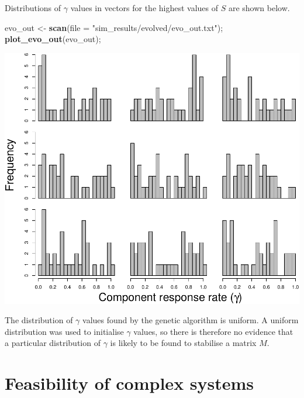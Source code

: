 \documentclass[]{article}
\newenvironment{Shaded}{\begin{snugshade}}{\end{snugshade}}
\newcommand{\KeywordTok}[1]{\textcolor[rgb]{0.13,0.29,0.53}{\textbf{{#1}}}}
\newcommand{\DataTypeTok}[1]{\textcolor[rgb]{0.13,0.29,0.53}{{#1}}}
\newcommand{\StringTok}[1]{\textcolor[rgb]{0.31,0.60,0.02}{{#1}}}
\newcommand{\NormalTok}[1]{{#1}}
\begin{document}
Distributions of \(\gamma\) values in vectors for the highest values of
\(S\) are shown below.

\begin{Shaded}
\begin{Highlighting}[]
\NormalTok{evo_out <-}\StringTok{ }\KeywordTok{scan}\NormalTok{(}\DataTypeTok{file =} \StringTok{"sim_results/evolved/evo_out.txt"}\NormalTok{);}
\KeywordTok{plot_evo_out}\NormalTok{(evo_out);}
\end{Highlighting}
\end{Shaded}

\includegraphics{unnamed-chunk-31-1.pdf}

The distribution of \(\gamma\) values found by the genetic algorithm is
uniform. A uniform distribution was used to initialise \(\gamma\)
values, so there is therefore no evidence that a particular distribution
of \(\gamma\) is likely to be found to stabilise a matrix \(M\).

\hypertarget{Feasibility}{\section{Feasibility of complex
systems}\label{Feasibility}}
\end{document}
